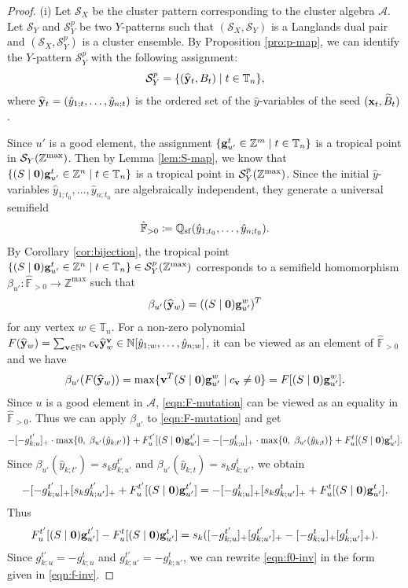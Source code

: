 \documentclass[12pt]{amsart}
\theoremstyle{definition}
\theoremstyle{remark}
\numberwithin{equation}{section}
\begin{document}
\begin{proof}
(i) Let $\mathcal S_X$ be the cluster pattern corresponding to the cluster algebra $\mathcal A$. Let $\mathcal S_Y$ and $\mathcal S_Y^p$ be two $Y$-patterns such that $(\mathcal S_X,\mathcal S_Y)$ is a Langlands dual pair and $(\mathcal S_X,\mathcal S_Y^p)$ is a cluster ensemble. By Proposition \ref{pro:p-map}, we can identify the $Y$-pattern $\mathcal S_Y^p$ with the following assignment:
\[ \mathcal S_Y^p=\{(\widehat{\bf y}_t, B_t)\mid t\in\mathbb T_n\},\]
where $\widehat{\bf y}_t=(\hat y_{1;t},\ldots,\hat y_{n;t})$ is the ordered set of the $\hat y$-variables of the seed $({\bf x}_t,\widetilde B_t)$.



Since $u'$ is a good element, the assignment $\{{\bf g}_{u'}^t\in\mathbb Z^m\mid t\in\mathbb T_n\}$ is a tropical point in $\mathcal S_Y(\mathbb Z^{\rm max})$. Then by Lemma \ref{lem:S-map}, we know that $\{(S\mid {\bf 0}){\bf g}_{u'}^t\in\mathbb Z^n\mid t\in\mathbb T_n\}$ is a tropical point in $\mathcal S_Y^p(\mathbb Z^{\rm max})$. Since the initial $\hat y$-variables  $\hat y_{1;t_0},\ldots,\hat y_{n;t_0}$ are algebraically independent, they generate a universal semifield \[\hat{\mathbb F}_{>0}\coloneqq \mathbb Q_{\rm sf}(\hat y_{1;t_0},\ldots,\hat y_{n;t_0}).\] By Corollary \ref{cor:bijection}, the tropical point $\{(S\mid {\bf 0}){\bf g}_{u'}^t\in\mathbb Z^n\mid t\in\mathbb T_n\}\in \mathcal S_Y^p(\mathbb Z^{\rm max})$ corresponds to  a semifield homomorphism $\beta_{u'}:\hat{\mathbb F}_{>0}\rightarrow \mathbb Z^{\max}$ such that \[\beta_{u'}(\widehat {\bf y}_w)=((S\mid{\bf 0}){\bf g}_{u'}^w)^T\] for any vertex $w\in\mathbb T_n$.
For a non-zero polynomial $F(\widehat{ \bf y}_{w})=\sum_{{\bf v}\in\mathbb N^n}c_{\bf v}\widehat {\bf y}_w^{\bf v}\in \mathbb N[\hat y_{1;w},\ldots,\hat y_{n;w}]
$, it can be viewed as an element of $\hat{\mathbb F}_{>0}$ and
we have 
\[\beta_{u'}(F(\widehat {\bf y}_w))=\max\{{\bf v}^T (S\mid {\bf 0}){\bf g}_{u'}^w\mid c_{\bf v}\neq 0\}=F[(S\mid {\bf 0}){\bf g}_{u'}^w].\]
Since $u$ is a good element in $\mathcal A$, \eqref{eqn:F-mutation} can be viewed as an equality in $\hat{\mathbb F}_{>0}$. Thus we can apply $\beta_{u'}$ to \eqref{eqn:F-mutation} and get
\[-[-g_{k;u}^{t'}]_+\cdot \max\{0,\;\beta_{u'}(\hat y_{k;t'})\}+F_u^{t'}[(S\mid {\bf 0}){\bf g}_{u'}^{t'}]=-[-g_{k;u}^t]_+\cdot \max\{0,\;\beta_{u'}(\hat y_{k;t})\}+F_u^t[(S\mid {\bf 0}){\bf g}_{u'}^t].
\]
Since $\beta_{u'}(\hat y_{k;t'})=s_kg_{k;u'}^{t'}$ and $\beta_{u'}(\hat y_{k;t})=s_kg_{k;u'}^t$, we obtain
\[-[-g_{k;u}^{t'}]_+[s_kg_{k;u'}^{t'}]_++F_u^{t'}[(S\mid {\bf 0}){\bf g}_{u'}^{t'}]=-[-g_{k;u}^t]_+[s_kg_{k;u'}^t]_++F_u^t[(S\mid {\bf 0}){\bf g}_{u'}^t].
\]
Thus 
\begin{eqnarray}\label{eqn:f0-inv}
     F_u^{t'}[(S\mid {\bf 0}){\bf g}_{u'}^{t'}]-F_u^t[(S\mid {\bf 0}){\bf g}_{u'}^t]=s_k([-g_{k;u}^{t'}]_+[g_{k;u'}^{t'}]_+-[-g_{k;u}^t]_+[g_{k;u'}^t]_+).
\end{eqnarray}
Since $g_{k;u}^{t'}=-g_{k;u}^t$ and $g_{k;u'}^{t'}=-g_{k;u'}^t$, we can rewrite \eqref{eqn:f0-inv} in the form given in \eqref{eqn:f-inv}.




\end{proof}
\end{document}
